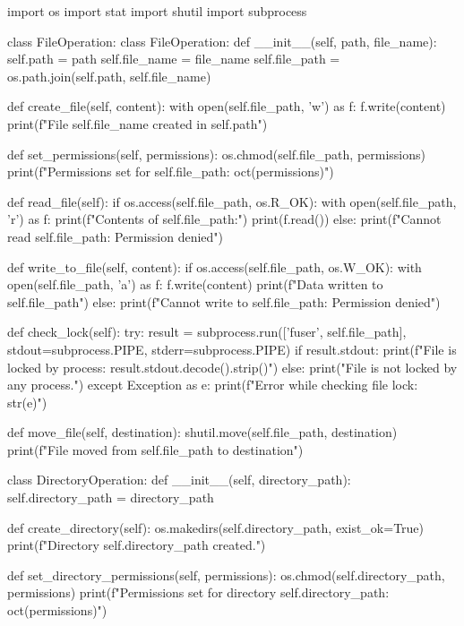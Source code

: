 \documentclass[12pt]{article}
\begin{document}
\begin{python}
    
import os
import stat
import shutil
import subprocess

class FileOperation:
    class FileOperation:
    def __init__(self, path, file_name):
        self.path = path
        self.file_name = file_name
        self.file_path = os.path.join(self.path, self.file_name)

    def create_file(self, content):
        with open(self.file_path, 'w') as f:
            f.write(content)
        print(f"File {self.file_name} created in {self.path}")

    def set_permissions(self, permissions):
        os.chmod(self.file_path, permissions)
        print(f"Permissions set for {self.file_path}: {oct(permissions)}")

    def read_file(self):
        if os.access(self.file_path, os.R_OK):
            with open(self.file_path, 'r') as f:
                print(f"Contents of {self.file_path}:")
                print(f.read())
        else:
            print(f"Cannot read {self.file_path}: Permission denied")

    def write_to_file(self, content):
        if os.access(self.file_path, os.W_OK):
            with open(self.file_path, 'a') as f:
                f.write(content)
            print(f"Data written to {self.file_path}")
        else:
            print(f"Cannot write to {self.file_path}: Permission denied")

    def check_lock(self):
        try:
            result = subprocess.run(['fuser', self.file_path], stdout=subprocess.PIPE, stderr=subprocess.PIPE)
            if result.stdout:
                print(f"File is locked by process: {result.stdout.decode().strip()}")
            else:
                print("File is not locked by any process.")
        except Exception as e:
            print(f"Error while checking file lock: {str(e)}")

    def move_file(self, destination):
        shutil.move(self.file_path, destination)
        print(f"File moved from {self.file_path} to {destination}")

class DirectoryOperation:
    def __init__(self, directory_path):
        self.directory_path = directory_path

    def create_directory(self):
        os.makedirs(self.directory_path, exist_ok=True)
        print(f"Directory {self.directory_path} created.")

    def set_directory_permissions(self, permissions):
        os.chmod(self.directory_path, permissions)
        print(f"Permissions set for directory {self.directory_path}: {oct(permissions)}")
    

\end{python}
\end{document}
